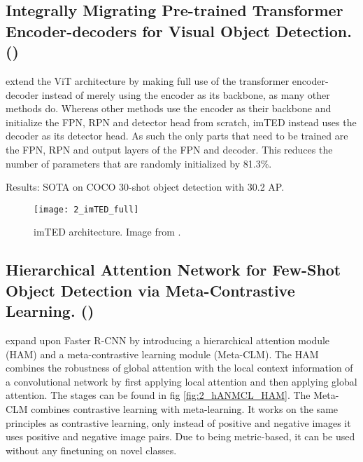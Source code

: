 


\subsection*{Integrally Migrating Pre-trained Transformer Encoder-decoders
for Visual Object Detection. (\citet{imTED})}

\citet{imTED} extend the ViT architecture by making full use of the transformer encoder-decoder instead of merely using the encoder as its backbone, as many other methods do. Whereas other methods use the encoder as their backbone and initialize the FPN, RPN and detector head from scratch, imTED instead uses the decoder as its detector head. As such the only parts that need to be trained are the FPN, RPN and output layers of the FPN and decoder. This reduces the number of parameters that are randomly initialized by 81.3\%.

Results: SOTA on COCO 30-shot object detection with 30.2 AP.

\begin{figure}[h]
	\centering
	\texttt{[image: 2\_imTED\_full]}
	\caption{\label{fig:2_imTED_full} imTED architecture. Image from \citet{imTED}.}
\end{figure}

\subsection*{Hierarchical Attention Network for Few-Shot
Object Detection via Meta-Contrastive Learning. (\citet{hANMCL})}

\citet{hANMCL} expand upon Faster R-CNN \citep{fasterrcnn} by introducing a  hierarchical attention module (HAM) and a meta-contrastive learning module (Meta-CLM). The HAM combines the robustness of global attention with the local context information of a convolutional network by first applying local attention and then applying global attention. The stages can be found in fig \ref{fig:2_hANMCL_HAM}. The Meta-CLM combines contrastive learning with meta-learning. It works on the same principles as contrastive learning, only instead of positive and negative images it uses positive and negative image pairs. Due to being metric-based, it can be used without any finetuning on novel classes.

